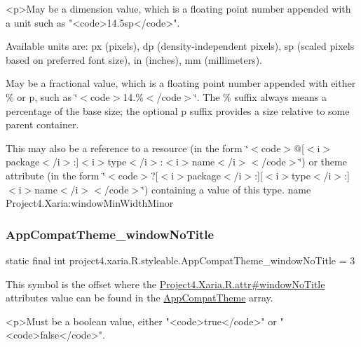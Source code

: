 \begin{DoxyVerb}      <p>May be a dimension value, which is a floating point number appended with a unit such as "<code>14.5sp</code>".
\end{DoxyVerb}
 Available units are\+: px (pixels), dp (density-\/independent pixels), sp (scaled pixels based on preferred font size), in (inches), mm (millimeters). 

May be a fractional value, which is a floating point number appended with either \% or p, such as \char`\"{}$<$code$>$14.\%$<$/code$>$\char`\"{}. The \% suffix always means a percentage of the base size; the optional p suffix provides a size relative to some parent container. 

This may also be a reference to a resource (in the form \char`\"{}$<$code$>$@\mbox{[}$<$i$>$package$<$/i$>$\+:\mbox{]}$<$i$>$type$<$/i$>$\+:$<$i$>$name$<$/i$>$$<$/code$>$\char`\"{}) or theme attribute (in the form \char`\"{}$<$code$>$?\mbox{[}$<$i$>$package$<$/i$>$\+:\mbox{]}\mbox{[}$<$i$>$type$<$/i$>$\+:\mbox{]}$<$i$>$name$<$/i$>$$<$/code$>$\char`\"{}) containing a value of this type.  name Project4.\+Xaria\+:window\+Min\+Width\+Minor \mbox{\label{classproject4_1_1xaria_1_1R_1_1styleable_ad3263d106700d1119508ee7eae3c01e2}} 
\subsubsection{\texorpdfstring{App\+Compat\+Theme\+\_\+window\+No\+Title}{AppCompatTheme\_windowNoTitle}}
{\footnotesize\ttfamily static final int project4.\+xaria.\+R.\+styleable.\+App\+Compat\+Theme\+\_\+window\+No\+Title = 3\hspace{0.3cm}{\ttfamily [static]}}

This symbol is the offset where the \hyperlink{}{Project4.\+Xaria.\+R.\+attr\#window\+No\+Title} attribute\textquotesingle{}s value can be found in the \hyperlink{classproject4_1_1xaria_1_1R_1_1styleable_aad8bec413e2350f9404e6ff0e831a85d}{App\+Compat\+Theme} array.

\begin{DoxyVerb}      <p>Must be a boolean value, either "<code>true</code>" or "<code>false</code>".
\end{DoxyVerb}
 

